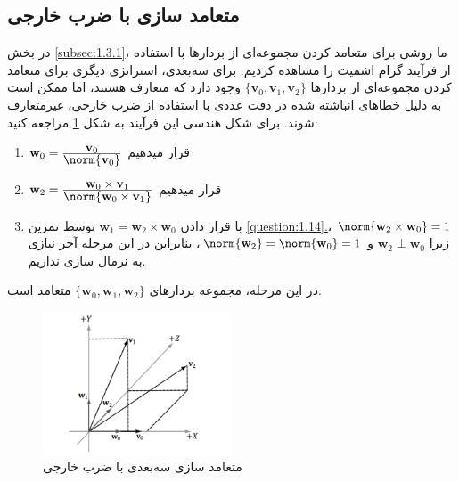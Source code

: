 \subsection{\textbf{متعامد سازی با ضرب خارجی}}
\label{subsec:1.4.2}
{
    \Large
    \begin{spacing}{1.5}
        در بخش \ref{subsec:1.3.1}، ما روشی برای متعامد کردن مجموعه‌ای از بردارها با استفاده از فرآیند گرام اشمیت را مشاهده کردیم.
        برای سه‌بعدی، استراتژی دیگری برای متعامد کردن مجموعه‌ای از بردارها $\{\textbf{v}_{0},\textbf{v}_{1},\textbf{v}_{2}\}$ وجود دارد که متعارف هستند،
        اما ممکن است به دلیل خطاهای انباشته شده در دقت عددی با استفاده از ضرب خارجی، غیرمتعارف شوند.
        برای شکل هندسی این فرآیند به شکل \ref{fig:4.Session.1.1.15} مراجعه کنید:

        \begin{enumerate}[label=\textbf{\arabic*}.]
            \item {$\textbf{w}_{0}=\frac{\displaystyle\textbf{v}_{0}}{\displaystyle\norm{\textbf{v}_{0}}}$ قرار میدهیم}
            \item {$\textbf{w}_{2}=\frac{\displaystyle\textbf{w}_{0}\times\textbf{v}_{1}}{\displaystyle\norm{\textbf{w}_{0}\times\textbf{v}_{1}}}$ قرار میدهیم}
            \item {با قرار دادن $\textbf{w}_{1}=\textbf{w}_{2}\times\textbf{w}_{0}$ توسط تمرین \hyperref[question:1.14]{\ref{question:1.14}.}، $\norm{\textbf{w}_{2}\times\textbf{w}_{0}}=1$ زیرا $\textbf{w}_{2}\perp\textbf{w}_{0}$ و $\norm{\textbf{w}_{2}}=\norm{\textbf{w}_{0}}=1$،
            بنابراین در این مرحله آخر نیازی به نرمال سازی نداریم.}
        \end{enumerate}

        در این مرحله، مجموعه بردارهای $\{\textbf{w}_{0},\textbf{w}_{1},\textbf{w}_{2}\}$ متعامد است.

        \begin{figure}[H]
            \centering
            \setlength{\belowcaptionskip}{-10pt}
            \includegraphics[width=0.5\textwidth]{Images/4/1/4.Session.1.1.15}
            \caption {متعامد سازی سه‌بعدی با ضرب خارجی}
            \label{fig:4.Session.1.1.15}
        \end{figure}


\end{spacing}}
